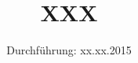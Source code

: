 

\subject{Versuchsprotokoll zum Versuch Nr. XXX}
\title{XXX}
\date{
  Durchführung: xx.xx.2015
}



\maketitle
\newpage






\printbibliography


